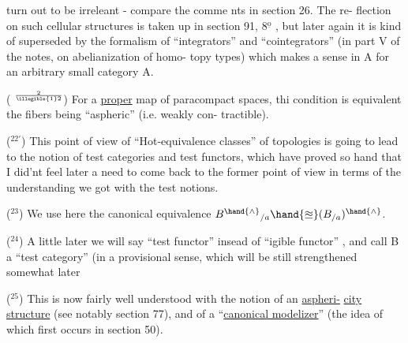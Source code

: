 
turn out to be irreleant - compare the comme nts in section 26. The re-%
flection on such cellular structures is taken up in section 91, 8$^{\underline{\mathrm{o}}}$ ,
but later again it is kind of superseded by the formalism of ``integrators''
and ``cointegrators''  (in part V of the notes,  on abelianization of homo-%
topy types) which makes a sense in A\hand{\ensuremath{^{\wedge}}}\hand{/} for an arbitrary small category A.

(\hand{!} $^{2\over{\illegible{1}}{2}}$)  For a \uline{proper} map of paracompact spaces, thi
condition is equivalent  the fibers being ``aspheric'' (i.e. weakly con-%
tractible).

($^{22'}$) This point of view of ``Hot-equivalence classes'' of topologies
is going to lead to the notion of test categories and test functors,
which have proved so hand that I did'nt feel later a need to come back
to the former point of view\hand{,} in terms of the understanding  we got with
the test notions.

($^{23}$) We use here the canonical equivalence $B^{\hand{\wedge}}{}_{/a} \hand{\ensuremath{\approxeq}} (B_{/a})^{\hand{\wedge}}$.

($^{24}$) A little later we will say ``test functor'' insead of ``igible
functor'' , and call B a ``test category'' (in a provisional sense, which
 will be still strengthened somewhat later\over{)}{,}   

($^{25}$) This is now fairly well understood with the notion of an \uline{aspheri-}%
\uline{city structure} (see notably section 77),  and of a ``\uline{canonical modelizer}''
(the idea of which first occurs in section 50).

